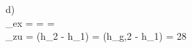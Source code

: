 d) \\
\varepsilon_{ex} =  =  =  \\

_{zu} =  (h_2 - h_1) =  (h_{g,2} - h_1) \quad {} \quad {} = 28  \\